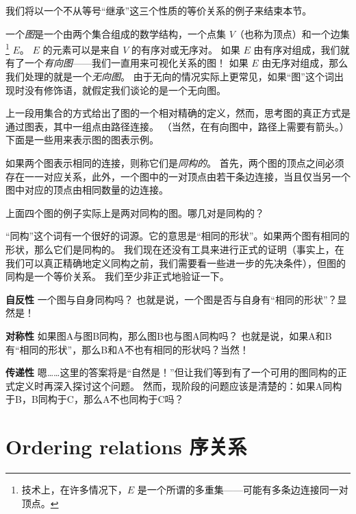 我们将以一个不从等号“继承”这三个性质的等价关系的例子来结束本节。

一个\emph{图}是一个由两个集合组成的数学结构，一个点集 $V$（也称为顶点）和一个边集\footnote{技术上，在许多情况下，$E$ 是一个所谓的多重集——可能有多条边连接同一对顶点。} $E$。
$E$ 的元素可以是来自 $V$ 的有序对或无序对。
如果 $E$ 由有序对组成，我们就有了一个\emph{有向图}——我们一直用来可视化关系的图！
如果 $E$ 由无序对组成，那么我们处理的就是一个\emph{无向图}。
由于无向的情况实际上更常见，如果“图”这个词出现时没有修饰语，就假定我们谈论的是一个无向图。

上一段用集合的方式给出了图的一个相对精确的定义，然而，思考图的真正方式是通过图表，其中一组点由路径连接。
（当然，在有向图中，路径上需要有箭头。）下面是一些用来表示图的图表示例。

\begin{center}

\end{center}

如果两个图表示相同的连接，则称它们是\emph{同构的}。
首先，两个图的顶点之间必须存在一一对应关系，此外，一个图中的一对顶点由若干条边连接，当且仅当另一个图中对应的顶点由相同数量的边连接。

\begin{exer}
上面四个图的例子实际上是两对同构的图。哪几对是同构的？
\end{exer}

“同构”这个词有一个很好的词源。它的意思是“相同的形状”。如果两个图有相同的形状，那么它们是同构的。
我们现在还没有工具来进行正式的证明（事实上，在我们可以真正精确地定义同构之前，我们需要看一些进一步的先决条件），但图的同构是一个等价关系。
我们至少非正式地验证一下。

{\bf 自反性} 一个图与自身同构吗？
也就是说，一个图是否与自身有“相同的形状”？显然是！

{\bf 对称性} 如果图A与图B同构，那么图B也与图A同构吗？
也就是说，如果A和B有“相同的形状”，那么B和A不也有相同的形状吗？当然！

{\bf 传递性} 嗯……这里的答案将是“自然是！”但让我们等到有了一个可用的图同构的正式定义时再深入探讨这个问题。
然而，现阶段的问题应该是清楚的：如果A同构于B，B同构于C，那么A不也同构于C吗？

\newpage





\newpage

\section{Ordering relations 序关系}
\label{sec:ord_rel}

